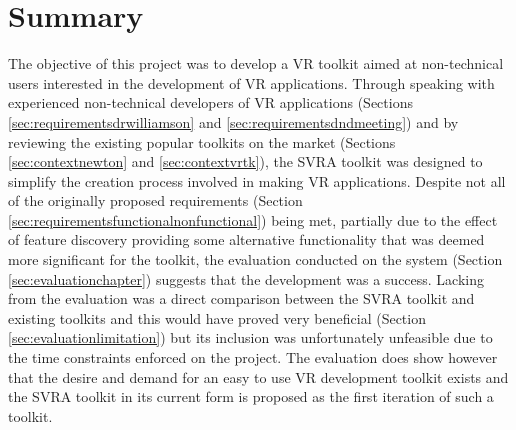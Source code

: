 \documentclass{l4proj}
\begin{document}
\section{Summary}
The objective of this project was to develop a VR toolkit aimed at non-technical users interested in the development of VR applications. Through speaking with experienced non-technical developers of VR applications (Sections \ref{sec:requirementsdrwilliamson} and \ref{sec:requirementsdndmeeting}) and by reviewing the existing popular toolkits on the market (Sections \ref{sec:contextnewton} and \ref{sec:contextvrtk}), the SVRA toolkit was designed to simplify the creation process involved in making VR applications. Despite not all of the originally proposed requirements (Section  \ref{sec:requirementsfunctionalnonfunctional}) being met, partially due to the effect of feature discovery providing some alternative functionality that was deemed more significant for the toolkit, the evaluation conducted on the system (Section \ref{sec:evaluationchapter}) suggests that the development was a success. Lacking from the evaluation was a direct comparison between the SVRA toolkit and existing toolkits and this would have proved very beneficial (Section \ref{sec:evaluationlimitation}) but its inclusion was unfortunately unfeasible due to the time constraints enforced on the project. The evaluation does show however that the desire and demand for an easy to use VR development toolkit exists and the SVRA toolkit in its current form is proposed as the first iteration of such a toolkit.
\end{document}
